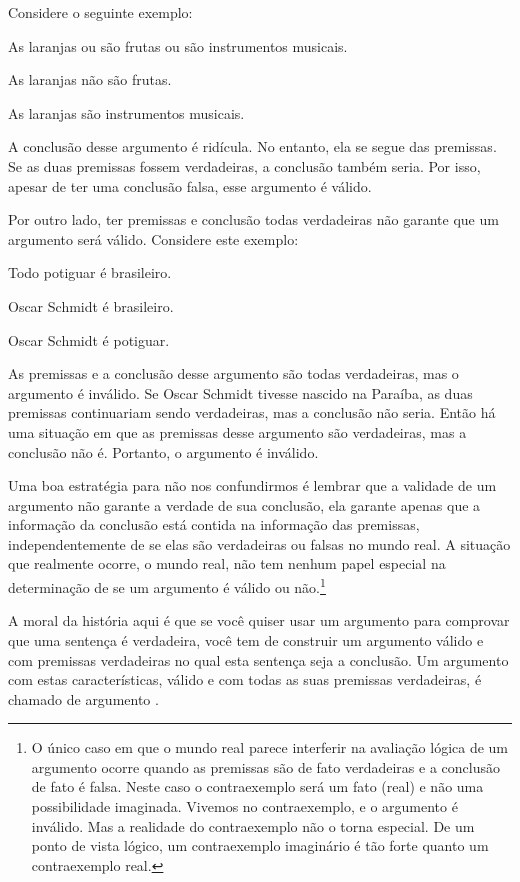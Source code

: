 Considere o seguinte exemplo:
	\begin{earg}
		\item[] As laranjas ou são frutas ou são instrumentos musicais.
		\item[] As laranjas não são frutas.
		\item[\therefore] As laranjas são instrumentos musicais.
	\end{earg}
A conclusão desse argumento é ridícula. No entanto, ela se segue das premissas.
Se as duas premissas fossem verdadeiras, a conclusão também seria.
Por isso, apesar de ter uma conclusão falsa, esse argumento é válido.

Por outro lado, ter premissas e conclusão todas verdadeiras não garante que um argumento será válido.
Considere este exemplo:
	\begin{earg}
		\item[] Todo potiguar é brasileiro.
		\item[] Oscar Schmidt é brasileiro.
		\item[\therefore] Oscar Schmidt é potiguar.
	\end{earg}
As premissas e a conclusão desse argumento são todas verdadeiras, mas o argumento é inválido.
Se Oscar Schmidt tivesse nascido na Paraíba, as duas premissas continuariam sendo verdadeiras, mas a conclusão não seria.
Então há uma situação em que as premissas desse argumento são verdadeiras, mas a conclusão não é.
Portanto, o argumento é inválido.

Uma boa estratégia para não nos confundirmos é lembrar que a validade de um argumento não garante a verdade de sua conclusão, ela garante apenas que a informação da conclusão está contida na informação das premissas, independentemente de se elas são verdadeiras ou falsas no mundo real.
A situação que realmente ocorre, o mundo real, não tem nenhum papel especial na determinação de se um argumento é válido ou não.\footnote{
	O único caso em que o mundo real parece interferir na avaliação lógica de um argumento ocorre quando as premissas são de fato verdadeiras e a conclusão de fato é falsa.
	Neste caso o contraexemplo será um fato (real) e não uma possibilidade imaginada.
	Vivemos no contraexemplo, e o argumento é inválido.
	Mas a realidade do contraexemplo não o torna especial.
	De um ponto de vista lógico, um contraexemplo imaginário é tão forte quanto um contraexemplo real.}

A moral da história aqui é que se você quiser usar um argumento para comprovar que uma sentença é verdadeira, você tem de construir um argumento válido e com premissas verdadeiras no qual esta sentença seja a conclusão.
Um argumento com estas características, válido e com todas as suas premissas verdadeiras, é chamado de argumento .

